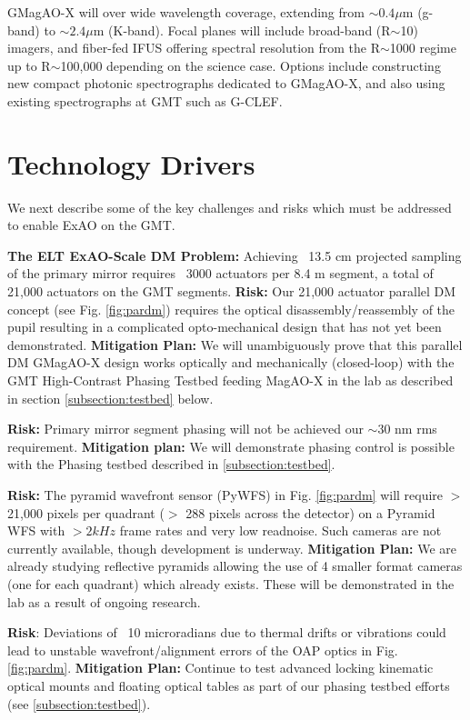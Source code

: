 \documentclass[12pt,preprint]{aastex}
\begin{document}
GMagAO-X will over wide wavelength coverage, extending from $\sim 0.4 \mu$m (g-band) to $\sim 2.4 \mu$m (K-band).  Focal planes will include broad-band (R$\sim$10) imagers, and fiber-fed IFUS offering spectral resolution from the R$\sim$1000 regime up to R$\sim$100,000 depending on the science case. Options include constructing new compact photonic spectrographs dedicated to GMagAO-X, and also using existing spectrographs at GMT such as G-CLEF.

\section{Technology Drivers} 

We next describe some of the key challenges and risks which must be addressed to enable ExAO on the GMT.

\textbf{The ELT ExAO-Scale DM Problem:} Achieving ~13.5 cm projected sampling of the primary mirror requires ~3000 actuators per 8.4 m segment, a total of 21,000 actuators on the GMT segments. \textbf{Risk:} Our 21,000 actuator parallel DM concept (see Fig. \ref{fig:pardm}) requires the optical disassembly/reassembly of the pupil resulting in a complicated opto-mechanical design that has not yet been demonstrated. \textbf{Mitigation Plan:} We will unambiguously prove that this parallel DM GMagAO-X design works optically and mechanically (closed-loop) with the GMT High-Contrast Phasing Testbed feeding MagAO-X in the lab as described in section \ref{subsection:testbed} below. 

\textbf{Risk:} Primary mirror segment phasing will not be achieved our $\sim$30 nm rms requirement. \textbf{Mitigation plan:} We will demonstrate phasing control is possible with the Phasing testbed described in \ref{subsection:testbed}. 

\textbf{Risk:} The pyramid wavefront sensor (PyWFS) in Fig. \ref{fig:pardm} will require $>$ 21,000 pixels per quadrant ($>$ 288 pixels across the detector) on a Pyramid WFS with $>2kHz$ frame rates and very low readnoise.  Such cameras are not currently available, though development is underway. \textbf{Mitigation Plan:}  We are already studying reflective pyramids allowing the use of 4 smaller format cameras (one for each quadrant) which already exists. These will be demonstrated in the lab as a result of ongoing research.

\textbf{Risk}: Deviations of ~10 microradians due to thermal drifts or vibrations could lead to unstable wavefront/alignment errors of the OAP optics in Fig. \ref{fig:pardm}. \textbf{Mitigation Plan:} Continue to test advanced locking kinematic optical mounts and floating optical tables as part of our phasing testbed efforts (see \ref{subsection:testbed}).
\end{document}
